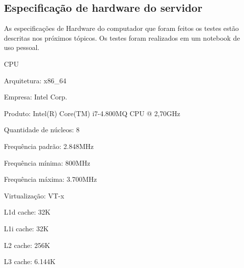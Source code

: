 \begin{anexosenv}

    \partanexos

    \chapter{Especificação de hardware do servidor}\label{anexo-especificacao-de-hardware-do-servidor}

        As especificações de Hardware
        do computador que foram feitos os testes estão descritas nos próximos tópicos.
        Os testes foram realizados em um notebook de uso pessoal.

        \begin{alineas}

        \item CPU

        \begin{alineas}

            \item Arquitetura: x86\_64

            \item Empresa: Intel Corp.

            \item Produto: Intel(R) Core(TM) i7-4.800MQ CPU @ 2,70GHz

            \item Quantidade de núcleos: 8

            \item Frequência padrão: 2.848MHz

            \item Frequência mínima:  800MHz

            \item Frequência máxima: 3.700MHz

            \item Virtualização: VT-x

            \item L1d cache: 32K

            \item L1i cache: 32K

            \item L2 cache: 256K

            \item L3 cache: 6.144K

        \end{alineas}


\end{alineas}
\end{anexosenv}
